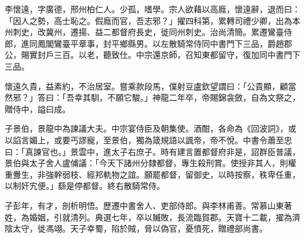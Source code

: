 \begin{pinyinscope}
 李懷遠，字廣德，邢州柏仁人。少孤，嗜學。宗人欲藉以高廕，懷遠辭，退而曰：「因人之勢，高士恥之。假廕而官，吾志邪？」擢四科第，累轉司禮少卿，出為本州刺史，改冀州，遷揚、益二都督府長史，徙同州刺史。治尚清簡。累遷鸞臺侍郎，進同鳳閣鸞臺平章事，封平鄉縣男。以左散騎常侍同中書門下三品，爵趙郡公，賜實封戶三百。以老，聽致仕。中宗還京師，召知東都留守，復加同中書門下三品。



 懷遠久貴，益素約，不治居室。嘗乘款段馬，僕射豆盧欽望謂曰：「公貴顯，顧當然邪？」答曰：「吾幸其馴，不願它駿。」神龍二年卒，帝賜錦衾斂，自為文祭之，贈侍中，謚曰成。



 子景伯，景龍中為諫議大夫。中宗宴侍臣及朝集使。酒酣，各命為《回波詞》，或以諂言媚上，或要丐謬寵，至景伯，獨為箴規語以諷帝，帝不悅。中書令蕭至忠曰：「真諫官也。」景雲中，進太子右庶子。時有建言置都督府非是，詔群臣普議，景伯與太子舍人盧俌議：「今天下諸州分隸都督，專生殺刑賞。使授非其人，則權重釁生，非強幹弱枝、經邦軌物之誼。願罷都督，留御史，以時按察，秩卑任重，以制奸宄便。」繇是停都督。終右散騎常侍。



 子彭年，有才，剖析明悟。歷遷中書舍人、吏部侍郎。與李林甫善。常慕山東著姓，為婚姻，引就清列。典選七年，卒以贓敗，長流臨賀郡。天寶十二載，擢為濟陰太守，徙馮翊。天子幸蜀，陷於賊，脅以偽官，憂憤死，贈禮部尚書。



\end{pinyinscope}